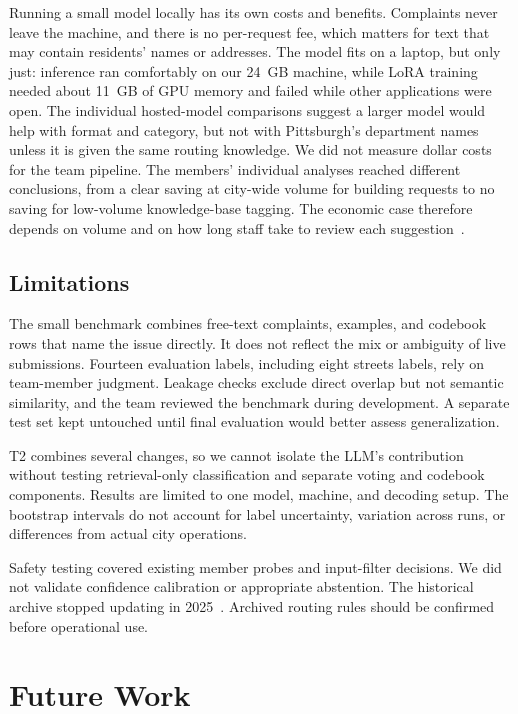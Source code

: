 \documentclass[11pt,letterpaper]{article}
\begin{document}
Running a small model locally has its own costs and benefits. Complaints never leave the machine, and there is no per-request fee, which matters for text that may contain residents' names or addresses. The model fits on a laptop, but only just: inference ran comfortably on our 24~GB machine, while LoRA training needed about 11~GB of GPU memory and failed while other applications were open. The individual hosted-model comparisons suggest a larger model would help with format and category, but not with Pittsburgh's department names unless it is given the same routing knowledge. We did not measure dollar costs for the team pipeline. The members' individual analyses reached different conclusions, from a clear saving at city-wide volume for building requests to no saving for low-volume knowledge-base tagging. The economic case therefore depends on volume and on how long staff take to review each suggestion~\cite{team}.

\subsection{Limitations}

The small benchmark combines free-text complaints, examples, and codebook rows that name the issue directly. It does not reflect the mix or ambiguity of live submissions. Fourteen evaluation labels, including eight streets labels, rely on team-member judgment. Leakage checks exclude direct overlap but not semantic similarity, and the team reviewed the benchmark during development. A separate test set kept untouched until final evaluation would better assess generalization.

T2 combines several changes, so we cannot isolate the LLM's contribution without testing retrieval-only classification and separate voting and codebook components. Results are limited to one model, machine, and decoding setup. The bootstrap intervals do not account for label uncertainty, variation across runs, or differences from actual city operations.

Safety testing covered existing member probes and input-filter decisions. We did not validate confidence calibration or appropriate abstention. The historical archive stopped updating in 2025~\cite{archive}. Archived routing rules should be confirmed before operational use.

\section{Future Work}
\end{document}
